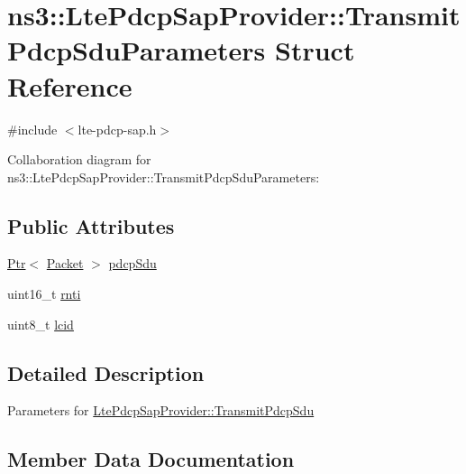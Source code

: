 \hypertarget{structns3_1_1LtePdcpSapProvider_1_1TransmitPdcpSduParameters}{}\section{ns3\+:\+:Lte\+Pdcp\+Sap\+Provider\+:\+:Transmit\+Pdcp\+Sdu\+Parameters Struct Reference}
\label{structns3_1_1LtePdcpSapProvider_1_1TransmitPdcpSduParameters}


{\ttfamily \#include $<$lte-\/pdcp-\/sap.\+h$>$}



Collaboration diagram for ns3\+:\+:Lte\+Pdcp\+Sap\+Provider\+:\+:Transmit\+Pdcp\+Sdu\+Parameters\+:
\subsection*{Public Attributes}
\begin{DoxyCompactItemize}
\item 
\hyperlink{classns3_1_1Ptr}{Ptr}$<$ \hyperlink{classns3_1_1Packet}{Packet} $>$ \hyperlink{structns3_1_1LtePdcpSapProvider_1_1TransmitPdcpSduParameters_ac9f5e992cf1231a4c525215bdf62628c}{pdcp\+Sdu}
\item 
uint16\+\_\+t \hyperlink{structns3_1_1LtePdcpSapProvider_1_1TransmitPdcpSduParameters_ae6083461f8f42ea8deb48e5892f56954}{rnti}
\item 
uint8\+\_\+t \hyperlink{structns3_1_1LtePdcpSapProvider_1_1TransmitPdcpSduParameters_a8b9904d4b2a62b6576188a84b7142ff6}{lcid}
\end{DoxyCompactItemize}


\subsection{Detailed Description}
Parameters for \hyperlink{classns3_1_1LtePdcpSapProvider_a3e9dd77bd2d09935fda263d1583f55f3}{Lte\+Pdcp\+Sap\+Provider\+::\+Transmit\+Pdcp\+Sdu} 

\subsection{Member Data Documentation}
